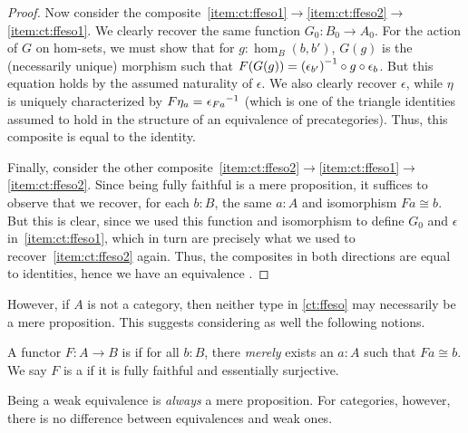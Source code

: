 \begin{proof}
  Now consider the composite~\ref{item:ct:ffeso1}$\to$\ref{item:ct:ffeso2}$\to$\ref{item:ct:ffeso1}.
  We clearly recover the same function $G_0:B_0 \to A_0$.
  For the action of $G$ on hom-sets, we must show that for $g:\hom_B(b,b')$, $G(g)$ is the (necessarily unique) morphism such that $F(G(g)) = {(\epsilon_{b'})}^{-1}\circ g \circ \epsilon_b$.
  But this equation holds by the assumed naturality of $\epsilon$.
  We also clearly recover $\epsilon$, while $\eta$ is uniquely characterized by $F\eta_a =_{} {\epsilon_{Fa}}^{-1}$ (which is one of the triangle identities assumed to hold in the structure of an equivalence of precategories).
  Thus, this composite is equal to the identity.

  Finally, consider the other composite~\ref{item:ct:ffeso2}$\to$\ref{item:ct:ffeso1}$\to$\ref{item:ct:ffeso2}.
  Since being fully faithful is a mere proposition, it suffices to observe that we recover, for each $b:B$, the same $a:A$ and isomorphism $F a \cong b$.
  But this is clear, since we used this function and isomorphism to define $G_0$ and $\epsilon$ in~\ref{item:ct:ffeso1}, which in turn are precisely what we used to recover~\ref{item:ct:ffeso2} again.
  Thus, the composites in both directions are equal to identities, hence we have an equivalence \eqv{\text{\ref{item:ct:ffeso1}}}{\text{\ref{item:ct:ffeso2}}}.
\end{proof}

However, if $A$ is not a category, then neither type in \cref{ct:ffeso} may necessarily be a mere proposition.
This suggests considering as well the following notions.

\begin{defn}\label{ct:essentially-surjective}
  A functor $F:A\to B$ is 
  if for all $b:B$, there \emph{merely} exists an $a:A$ such that $Fa\cong b$.
  We say $F$ is a 
  if it is fully faithful and essentially surjective.
\end{defn}

Being a weak equivalence is \emph{always} a mere proposition.
For categories, however, there is no difference between equivalences and weak ones.

